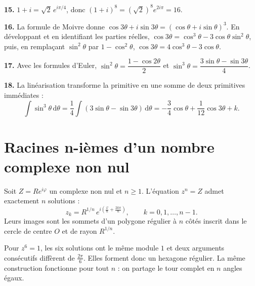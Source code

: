 \begin{corrige}
\textbf{15.} $1+i = \sqrt2\,e^{i\pi/4}$, donc
$(1+i)^{8} = \left(\sqrt2\right)^{8}e^{2i\pi} = 16$.

\textbf{16.} La formule de Moivre donne
$\cos3\theta+i\sin3\theta = \left(\cos\theta+i\sin\theta\right)^{3}$. En
développant et en identifiant les parties réelles,
$\cos3\theta = \cos^{3}\theta-3\cos\theta\sin^{2}\theta$, puis, en remplaçant
$\sin^{2}\theta$ par $1-\cos^{2}\theta$,
$\cos3\theta = 4\cos^{3}\theta-3\cos\theta$.

\textbf{17.} Avec les formules d'Euler,
$\sin^{2}\theta = \dfrac{1-\cos2\theta}{2}$ et
$\sin^{3}\theta = \dfrac{3\sin\theta-\sin3\theta}{4}$.

\textbf{18.} La linéarisation transforme la primitive en une somme de deux
primitives immédiates :
\[
  \int \sin^{3}\theta \,\mathrm{d}\theta
  = \frac14\int\left(3\sin\theta-\sin3\theta\right)\,\mathrm{d}\theta
  = -\frac34\cos\theta+\frac{1}{12}\cos3\theta+k .
\]
\end{corrige}

\section{Racines n-ièmes d'un nombre complexe non nul}

\begin{theoreme}
Soit $Z = Re^{i\varphi}$ un complexe non nul et $n \geq 1$. L'équation
$z^{n} = Z$ admet exactement $n$ solutions :
\[
  z_{k} = R^{1/n}\,e^{i\left(\frac{\varphi}{n}+\frac{2k\pi}{n}\right)},
  \qquad k = 0,1,\dots,n-1 .
\]
Leurs images sont les sommets d'un polygone régulier à $n$ côtés inscrit dans
le cercle de centre $O$ et de rayon $R^{1/n}$.
\end{theoreme}

\begin{visualisation}
\begin{center}
\end{center}

Pour $z^{6}=1$, les six solutions ont le même module $1$ et deux arguments
consécutifs diffèrent de $\frac{2\pi}{6}$. Elles forment donc un hexagone
régulier. La même construction fonctionne pour tout $n$ : on partage le tour
complet en $n$ angles égaux.
\end{visualisation}

